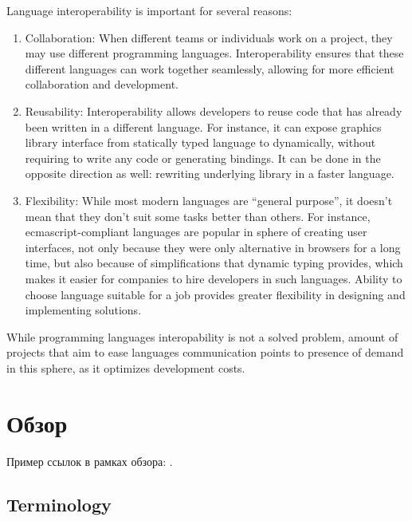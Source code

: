 \documentclass[times,specification,annotation]{itmo-student-thesis}
\begin{document}
\tableofcontents

\startprefacepage

Language interoperability is important for several reasons:

\begin{enumerate}
\item Collaboration: When different teams or individuals work on a project, they may use different programming languages. Interoperability ensures that these different languages can work together seamlessly, allowing for more efficient collaboration and development.

\item Reusability: Interoperability allows developers to reuse code that has already been written in a different language. For instance, it can expose graphics library interface from statically typed language to dynamically, without requiring to write any code or generating bindings. It can be done in the opposite direction as well: rewriting underlying library in a faster language.

\item Flexibility: While most modern languages are ``general purpose'', it doesn't mean that they don't suit some tasks better than others. For instance, ecmascript-compliant languages are popular in sphere of creating user interfaces, not only because they were only alternative in browsers for a long time, but also because of simplifications that dynamic typing provides, which makes it easier for companies to hire developers in such languages. Ability to choose language suitable for a job provides greater flexibility in designing and implementing solutions.
\end{enumerate}

While programming languages interopability is not a solved problem, amount of projects that aim to ease languages communication points to presence of demand in this sphere, as it optimizes development costs.

\chapter{Обзор}

\startrelatedwork
Пример ссылок в рамках обзора: \cite{example-english, example-russian, unrestricted-jump-evco, doerr-doerr-lambda-lambda-self-adjustment-arxiv}.

\section{Terminology}
\TODO
\end{document}

